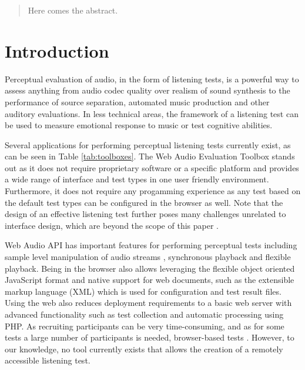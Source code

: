 \documentclass{sig-alternate}
\begin{document}
\maketitle
\begin{abstract}
Here comes the abstract. 
\end{abstract}


\section{Introduction}

	Perceptual evaluation of audio, in the form of listening tests, is a powerful way to assess anything from audio codec quality over realism of sound synthesis to the performance of source separation, automated music production and other auditory evaluations.
	In less technical areas, the framework of a listening test can be used to measure emotional response to music or test cognitive abilities. 


	Several applications for performing perceptual listening tests currently exist, as can be seen in Table \ref{tab:toolboxes}. The Web Audio Evaluation Toolbox stands out as it does not require proprietary software or a specific platform and provides a wide range of interface and test types in one user friendly environment. Furthermore, it does not require any progamming experience as any test based on the default test types can be configured in the browser as well. Note that the design of an effective listening test further poses many challenges unrelated to interface design, which are beyond the scope of this paper \cite{bech}. 

	Web Audio API has important features for performing perceptual tests including sample level manipulation of audio streams \cite{schoeffler2015mushra}, synchronous playback and flexible playback. Being in the browser also allows leveraging the flexible object oriented JavaScript format and native support for web documents, such as the extensible markup language (XML) which is used for configuration and test result files. Using the web also reduces deployment requirements to a basic web server with advanced functionality such as test collection and automatic processing using PHP. As recruiting participants can be very time-consuming, and as for some tests a large number of participants is needed, browser-based tests \cite{schoeffler2015mushra}. However, to our knowledge, no tool currently exists that allows the creation of a remotely accessible listening test. 
\end{document}
